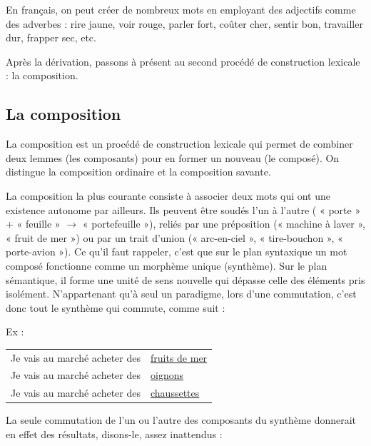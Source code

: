 En français, on peut créer de nombreux mots en employant des adjectifs comme des adverbes : rire jaune, voir rouge, parler fort, coûter cher, sentir bon, travailler dur, frapper sec, etc.

Après la dérivation, passons à présent au second procédé de construction lexicale : la composition.

\subsection{La composition}
La composition est un procédé de construction lexicale qui permet de combiner deux lemmes (les composants) pour en former un nouveau (le composé). On distingue la composition ordinaire et la composition savante.

La composition la plus courante consiste à associer deux mots qui ont une existence autonome par ailleurs. Ils peuvent être soudés l’un à l’autre ( « porte » + « feuille » $\rightarrow$ « portefeuille »), reliés par une préposition (« machine à laver », « fruit de mer ») ou par un trait d’union (« arc-en-ciel », « tire-bouchon », « porte-avion »). Ce qu’il faut rappeler, c’est que sur le plan syntaxique un mot composé fonctionne comme un morphème unique (synthème). Sur le plan sémantique, il forme une unité de sens nouvelle qui dépasse celle des éléments pris isolément. N’appartenant qu’à seul un paradigme, lors d’une commutation, c’est donc tout le synthème qui commute, comme suit :

\noindent Ex :\par\smallskip
\noindent\begin{tabularx}{\linewidth}{@{}Xl@{}}
Je vais au marché acheter des&\underline{fruits de mer}\\
Je vais au marché acheter des&\underline{oignons}\\
Je vais au marché acheter des&\underline{chaussettes}\\
\end{tabularx}

La seule commutation de l’un ou l’autre des composants du synthème donnerait en effet des résultats, disons-le, assez inattendus :

